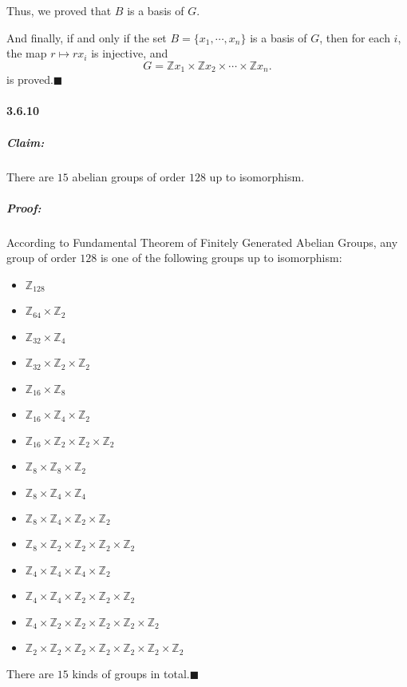 \documentclass[11pt]{article}
\begin{document}
			Thus, we proved that $B$ is a basis of $G$.
			
			And finally, if and only if the set $B = \{x_1, \cdots, x_n\}$ is a basis of $G$, then for each $i$, the map $r \mapsto rx_i$ is injective, and \[G = \mathbb{Z}x_1 \times \mathbb{Z}x_2 \times \cdots\times \mathbb{Z}x_n.\] is proved.$\blacksquare$
	\paragraph{3.6.10}
		\subparagraph{Claim:} There are $15$ abelian groups of order $128$ up to isomorphism.
		\subparagraph{Proof:} According to Fundamental Theorem of Finitely Generated Abelian Groups, any group of order $128$ is one of the following groups up to isomorphism:
		\begin{itemize}
			\item $\mathbb{Z}_{128}$
			\item $\mathbb{Z}_{64} \times \mathbb{Z}_{2}$
			\item $\mathbb{Z}_{32} \times \mathbb{Z}_{4}$
			\item $\mathbb{Z}_{32} \times \mathbb{Z}_{2} \times \mathbb{Z}_{2}$
			\item $\mathbb{Z}_{16} \times \mathbb{Z}_{8}$
			\item $\mathbb{Z}_{16} \times \mathbb{Z}_{4} \times \mathbb{Z}_{2}$
			\item $\mathbb{Z}_{16} \times \mathbb{Z}_{2} \times \mathbb{Z}_{2} \times \mathbb{Z}_{2}$
			\item $\mathbb{Z}_{8} \times \mathbb{Z}_{8} \times \mathbb{Z}_{2}$
			\item $\mathbb{Z}_{8} \times \mathbb{Z}_{4} \times \mathbb{Z}_{4}$
			\item $\mathbb{Z}_{8} \times \mathbb{Z}_{4} \times \mathbb{Z}_{2} \times \mathbb{Z}_{2}$
			\item $\mathbb{Z}_{8} \times \mathbb{Z}_{2} \times \mathbb{Z}_{2} \times \mathbb{Z}_{2} \times \mathbb{Z}_{2}$
			\item $\mathbb{Z}_{4} \times \mathbb{Z}_{4} \times \mathbb{Z}_{4} \times \mathbb{Z}_{2}$
			\item $\mathbb{Z}_{4} \times \mathbb{Z}_{4} \times \mathbb{Z}_{2} \times \mathbb{Z}_{2} \times \mathbb{Z}_{2}$
			\item $\mathbb{Z}_{4} \times \mathbb{Z}_{2} \times \mathbb{Z}_{2} \times \mathbb{Z}_{2} \times \mathbb{Z}_{2} \times \mathbb{Z}_{2}$
			\item $\mathbb{Z}_{2} \times \mathbb{Z}_{2} \times \mathbb{Z}_{2} \times \mathbb{Z}_{2} \times \mathbb{Z}_{2} \times \mathbb{Z}_{2} \times \mathbb{Z}_{2}$
		\end{itemize}
		
		There are $15$ kinds of groups in total.$\blacksquare$
\end{document}
